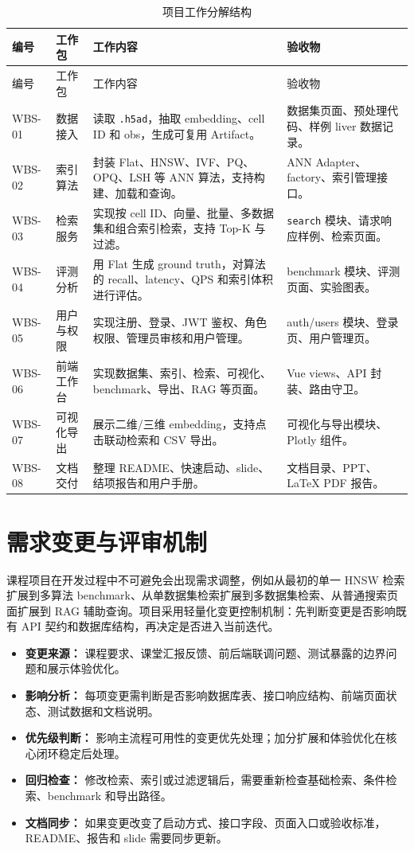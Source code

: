\documentclass[UTF8,a4paper,12pt]{ctexrep}
\begin{document}
\begin{longtable}{@{}L{0.12\textwidth}L{0.18\textwidth}L{0.42\textwidth}L{0.18\textwidth}@{}}
  \caption{项目工作分解结构} \\
  \toprule
  编号 & 工作包 & 工作内容 & 验收物 \\
  \midrule
  \endfirsthead
  \toprule
  编号 & 工作包 & 工作内容 & 验收物 \\
  \midrule
  \endhead
  WBS-01 & 数据接入 & 读取 \texttt{.h5ad}，抽取 embedding、cell ID 和 obs，生成可复用 Artifact。 & 数据集页面、预处理代码、样例 liver 数据记录。 \\
  WBS-02 & 索引算法 & 封装 Flat、HNSW、IVF、PQ、OPQ、LSH 等 ANN 算法，支持构建、加载和查询。 & ANN Adapter、factory、索引管理接口。 \\
  WBS-03 & 检索服务 & 实现按 cell ID、向量、批量、多数据集和组合索引检索，支持 Top-K 与过滤。 & \texttt{search} 模块、请求响应样例、检索页面。 \\
  WBS-04 & 评测分析 & 用 Flat 生成 ground truth，对算法的 recall、latency、QPS 和索引体积进行评估。 & benchmark 模块、评测页面、实验图表。 \\
  WBS-05 & 用户与权限 & 实现注册、登录、JWT 鉴权、角色权限、管理员审核和用户管理。 & auth/users 模块、登录页、用户管理页。 \\
  WBS-06 & 前端工作台 & 实现数据集、索引、检索、可视化、benchmark、导出、RAG 等页面。 & Vue views、API 封装、路由守卫。 \\
  WBS-07 & 可视化导出 & 展示二维/三维 embedding，支持点击联动检索和 CSV 导出。 & 可视化与导出模块、Plotly 组件。 \\
  WBS-08 & 文档交付 & 整理 README、快速启动、slide、结项报告和用户手册。 & 文档目录、PPT、LaTeX PDF 报告。 \\
  \bottomrule
\end{longtable}

\section{需求变更与评审机制}

课程项目在开发过程中不可避免会出现需求调整，例如从最初的单一 HNSW 检索扩展到多算法 benchmark、从单数据集检索扩展到多数据集检索、从普通搜索页面扩展到 RAG 辅助查询。项目采用轻量化变更控制机制：先判断变更是否影响既有 API 契约和数据库结构，再决定是否进入当前迭代。

\begin{itemize}
  \item \textbf{变更来源：} 课程要求、课堂汇报反馈、前后端联调问题、测试暴露的边界问题和展示体验优化。
  \item \textbf{影响分析：} 每项变更需判断是否影响数据库表、接口响应结构、前端页面状态、测试数据和文档说明。
  \item \textbf{优先级判断：} 影响主流程可用性的变更优先处理；加分扩展和体验优化在核心闭环稳定后处理。
  \item \textbf{回归检查：} 修改检索、索引或过滤逻辑后，需要重新检查基础检索、条件检索、benchmark 和导出路径。
  \item \textbf{文档同步：} 如果变更改变了启动方式、接口字段、页面入口或验收标准，README、报告和 slide 需要同步更新。
\end{itemize}
\end{document}
